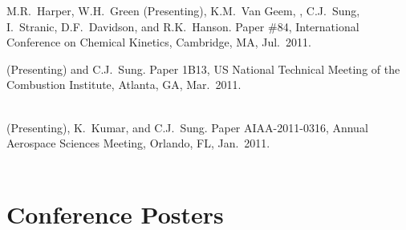 \begin{bibmune}
    \item M.R.\ Harper, W.H.\ Green (Presenting), K.M.\ Van Geem,
    , C.J.\ Sung, I.\ Stranic, D.F.\ Davidson,
    and R.K.\ Hanson.  Paper \#84,  International
    Conference on Chemical Kinetics, Cambridge, MA, Jul.\ 2011.

    \item {} (Presenting) and C.J.\ Sung.
     Paper 1B13,   US National Technical
    Meeting of the Combustion Institute, Atlanta, GA, Mar.\ 2011.\\
    \\

    \item {} (Presenting), K.\ Kumar, and C.J.\ Sung.
     Paper AIAA-2011-0316,
     Annual Aerospace Sciences Meeting,
    Orlando, FL, Jan.\ 2011.\\
    \\
\end{bibmune}

\section{{\sectionfont Conference Posters}}

